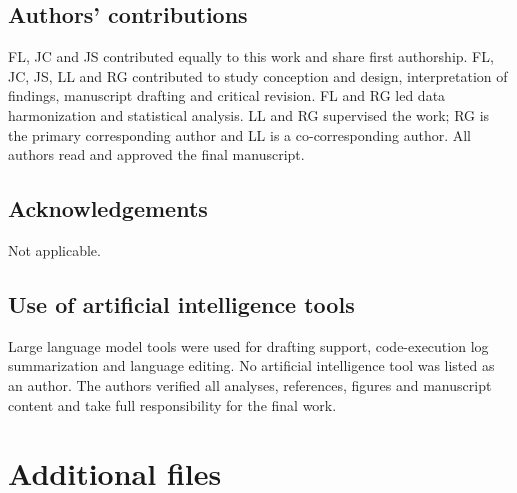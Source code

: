 \documentclass[pdflatex,sn-vancouver-num]{sn-jnl}
\begin{document}
\subsection*{Authors' contributions}
FL, JC and JS contributed equally to this work and share first authorship. FL, JC, JS, LL and RG contributed to study conception and design, interpretation of findings, manuscript drafting and critical revision. FL and RG led data harmonization and statistical analysis. LL and RG supervised the work; RG is the primary corresponding author and LL is a co-corresponding author. All authors read and approved the final manuscript.

\subsection*{Acknowledgements}
Not applicable.

\subsection*{Use of artificial intelligence tools}
Large language model tools were used for drafting support, code-execution log summarization and language editing. No artificial intelligence tool was listed as an author. The authors verified all analyses, references, figures and manuscript content and take full responsibility for the final work.













\section*{Additional files}
\end{document}
